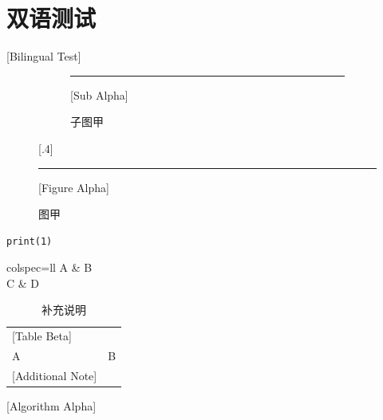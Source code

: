 
\hitif[lang=en]{\bilingualswapon}{\bilingualswapoff}
\chapter{双语测试}[Bilingual Test]
\begin{figure}[ht]
  \begin{subfigure}{.4\linewidth}
    \rule{2cm}{1cm}\caption{子图甲}[Sub Alpha]\label{sub:alpha}
  \end{subfigure}
  [.4\linewidth]{\rule{2cm}{1cm}}
  \caption{图甲}[Figure Alpha]\label{fig:alpha}
\end{figure}
\begin{lstlisting}[caption={{代码甲}[Code Alpha]},label=lst:alpha]
print(1)
\end{lstlisting}
\begin{longtblr}[caption={{长表甲}[Table Alpha]}]{colspec={ll}}
  A & B \\ C & D \\
\end{longtblr}
\begin{longtable}{ll}
  \caption{长表乙}[Table Beta]\\
  A & B \\
  \caption*{补充说明}[Additional Note]\\
\end{longtable}
\begin{algorithm}[ht]
  \caption{算法甲}[Algorithm Alpha]
\end{algorithm}

